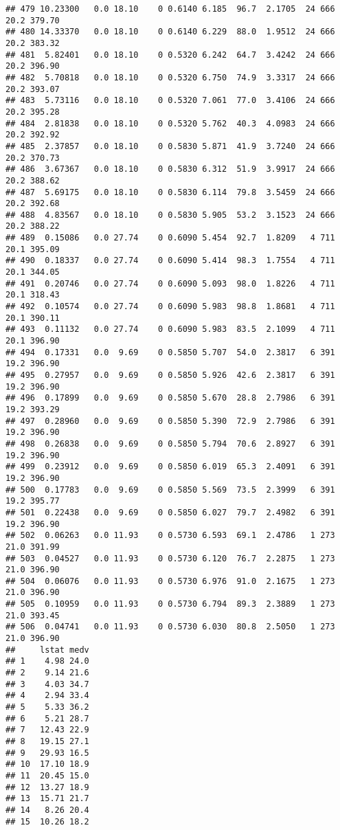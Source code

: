 \documentclass[
]{article}
\begin{document}
\begin{verbatim}
## 479 10.23300   0.0 18.10    0 0.6140 6.185  96.7  2.1705  24 666    20.2 379.70
## 480 14.33370   0.0 18.10    0 0.6140 6.229  88.0  1.9512  24 666    20.2 383.32
## 481  5.82401   0.0 18.10    0 0.5320 6.242  64.7  3.4242  24 666    20.2 396.90
## 482  5.70818   0.0 18.10    0 0.5320 6.750  74.9  3.3317  24 666    20.2 393.07
## 483  5.73116   0.0 18.10    0 0.5320 7.061  77.0  3.4106  24 666    20.2 395.28
## 484  2.81838   0.0 18.10    0 0.5320 5.762  40.3  4.0983  24 666    20.2 392.92
## 485  2.37857   0.0 18.10    0 0.5830 5.871  41.9  3.7240  24 666    20.2 370.73
## 486  3.67367   0.0 18.10    0 0.5830 6.312  51.9  3.9917  24 666    20.2 388.62
## 487  5.69175   0.0 18.10    0 0.5830 6.114  79.8  3.5459  24 666    20.2 392.68
## 488  4.83567   0.0 18.10    0 0.5830 5.905  53.2  3.1523  24 666    20.2 388.22
## 489  0.15086   0.0 27.74    0 0.6090 5.454  92.7  1.8209   4 711    20.1 395.09
## 490  0.18337   0.0 27.74    0 0.6090 5.414  98.3  1.7554   4 711    20.1 344.05
## 491  0.20746   0.0 27.74    0 0.6090 5.093  98.0  1.8226   4 711    20.1 318.43
## 492  0.10574   0.0 27.74    0 0.6090 5.983  98.8  1.8681   4 711    20.1 390.11
## 493  0.11132   0.0 27.74    0 0.6090 5.983  83.5  2.1099   4 711    20.1 396.90
## 494  0.17331   0.0  9.69    0 0.5850 5.707  54.0  2.3817   6 391    19.2 396.90
## 495  0.27957   0.0  9.69    0 0.5850 5.926  42.6  2.3817   6 391    19.2 396.90
## 496  0.17899   0.0  9.69    0 0.5850 5.670  28.8  2.7986   6 391    19.2 393.29
## 497  0.28960   0.0  9.69    0 0.5850 5.390  72.9  2.7986   6 391    19.2 396.90
## 498  0.26838   0.0  9.69    0 0.5850 5.794  70.6  2.8927   6 391    19.2 396.90
## 499  0.23912   0.0  9.69    0 0.5850 6.019  65.3  2.4091   6 391    19.2 396.90
## 500  0.17783   0.0  9.69    0 0.5850 5.569  73.5  2.3999   6 391    19.2 395.77
## 501  0.22438   0.0  9.69    0 0.5850 6.027  79.7  2.4982   6 391    19.2 396.90
## 502  0.06263   0.0 11.93    0 0.5730 6.593  69.1  2.4786   1 273    21.0 391.99
## 503  0.04527   0.0 11.93    0 0.5730 6.120  76.7  2.2875   1 273    21.0 396.90
## 504  0.06076   0.0 11.93    0 0.5730 6.976  91.0  2.1675   1 273    21.0 396.90
## 505  0.10959   0.0 11.93    0 0.5730 6.794  89.3  2.3889   1 273    21.0 393.45
## 506  0.04741   0.0 11.93    0 0.5730 6.030  80.8  2.5050   1 273    21.0 396.90
##     lstat medv
## 1    4.98 24.0
## 2    9.14 21.6
## 3    4.03 34.7
## 4    2.94 33.4
## 5    5.33 36.2
## 6    5.21 28.7
## 7   12.43 22.9
## 8   19.15 27.1
## 9   29.93 16.5
## 10  17.10 18.9
## 11  20.45 15.0
## 12  13.27 18.9
## 13  15.71 21.7
## 14   8.26 20.4
## 15  10.26 18.2

\end{verbatim}
\end{document}
